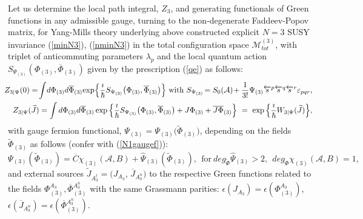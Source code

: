 \documentclass[10pt]{article}
\begin{document}
Let us determine the local   path integral, ${Z}_{3}$, and generating functionals of Green functions in any admissible gauge, turning to the non-degenerate Faddeev-Popov matrix, for Yang-Mills theory underlying above constructed explicit  $N=3$ SUSY invariance (\ref{minN3}), (\ref{nminN3}) in the total configuration space $\mathcal{M}^{(3)}_{tot}$, with triplet of anticommuting parameters $\lambda_p$  and the local  quantum action $S_{\Psi_{(3)}}(\Phi_{(3)}, \overline{\Phi}_{(3)})$ given by the prescription (\ref{qe})  as follows:
\begin{eqnarray}
\label{Pintlocn3}
  &\hspace{-1em}& \hspace{-0.5em}{Z}_{3|\Psi}(0) =  \hspace{-0.15em}\int \hspace{-0.15em}  d \Phi_{(3)} d \overline{\Phi}_{(3)}  \hspace{-0.15em}\exp \hspace{-0.15em}\Big\{\frac{\imath}{\hbar}S_{\Psi_{(3)}}\big(\Phi_{(3)}, \overline{\Phi}_{(3)}\big)\Big\} \ \mathrm{with}  \ S_{\Psi_{(3)}}\hspace{-0.15em}  = S_0(\mathcal{A}) \hspace{-0.15em}+\frac{1}{3!}%
\Psi_{(3)}\overleftarrow{s}{}^p\overleftarrow{s}{}^q\overleftarrow{s}{}^r \varepsilon_{pqr},\\
\label{GFlocn3}
  &\hspace{-1em}& \hspace{-0.5em} {Z}_{3|\Psi}(\widetilde{J}) =  \int  d \Phi_{(3)} d \overline{\Phi}_{(3)}  \exp \Big\{\frac{\imath}{\hbar}S_{\Psi_{(3)}}\big(\Phi_{(3)}, \overline{\Phi}_{(3)}\big) + J\Phi_{(3)}+\overline{J} \overline{\Phi}_{(3)}\Big\} \ =\ \exp \Big\{\frac{\imath}{\hbar}W_{3|\Psi}(\widetilde{J})\Big\},   \end{eqnarray}
with gauge fermion functional, $\Psi_{(3)}=\Psi_{(3)}\big(\widetilde{\Phi}_{(3)}\big)$, depending on the fields $\widetilde{\Phi}_{(3)}$ as follows (confer with (\ref{N1gaugef})):
\begin{equation}\label{N3gaugef}
  \Psi_{(3)}(\widetilde{\Phi}_{(3)}) = \overline{C}\chi_{(3)}(\mathcal{A},B)  +  \widehat{\Psi}_{(3)}(\widetilde{\Phi}_{(3)}), \   \ \mathrm{for} \ deg_{\widetilde{\Phi}}\widehat{\Psi}_{(3)}>2, \ \ deg_{\Phi}{} \chi_{(3)}(\mathcal{A},B) = 1,
\end{equation}
and external sources $ \widetilde{J}_{A^t_3} = \big(J_{A_3}$, $\overline{J}_{A^n_3}\big)$  to the respective Green functions related to the fields $\Phi^{A_3}_{(3)}, \overline{\Phi}{}^{A^n_3}_{(3)}$ with the same Grassmann parities: $\epsilon(J_{A_3}) = \epsilon(\Phi^{A_3}_{(3)})$,  $\epsilon(\overline{J}_{A^n_3}) = \epsilon(\overline{\Phi}{}^{A^n_3}_{(3)})$.
\end{document}
